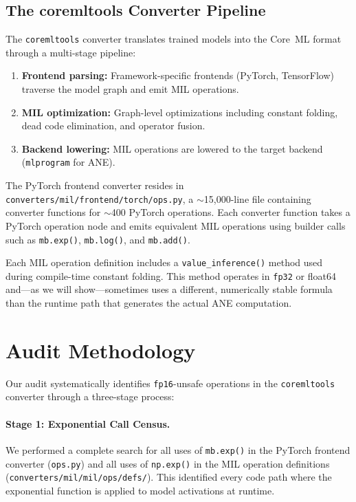 \documentclass[10pt,twocolumn]{article}
\newcommand{\fp}{\texttt{fp16}}
\newcommand{\fpt}{\texttt{fp32}}
\newcommand{\ane}{ANE}
\newcommand{\coreml}{Core~ML}
\newcommand{\coremltools}{\texttt{coremltools}}
\begin{document}
\subsection{The coremltools Converter Pipeline}
\label{sec:pipeline}

The \coremltools{} converter translates trained models into the
\coreml{} format through a multi-stage pipeline:

\begin{enumerate}[leftmargin=*,itemsep=1pt]
  \item \textbf{Frontend parsing:} Framework-specific frontends
    (PyTorch, TensorFlow) traverse the model graph and emit MIL
    operations.

  \item \textbf{MIL optimization:} Graph-level optimizations
    including constant folding, dead code elimination, and operator
    fusion.

  \item \textbf{Backend lowering:} MIL operations are lowered to
    the target backend (\texttt{mlprogram} for \ane{}).
\end{enumerate}

The PyTorch frontend converter resides in
\texttt{converters/mil/frontend/\allowbreak{}torch/ops.py}, a
$\sim$15{,}000-line file containing converter functions for $\sim$400 PyTorch
operations.  Each converter function takes a PyTorch operation node and emits
equivalent MIL operations using builder calls such as \texttt{mb.exp()},
\texttt{mb.log()}, and \texttt{mb.add()}.

Each MIL operation definition includes a \texttt{value\_inference()} method used
during compile-time constant folding.  This method operates in \fpt{} or float64
and---as we will show---sometimes uses a different, numerically stable formula
than the runtime path that generates the actual \ane{} computation.

\section{Audit Methodology}
\label{sec:methodology}

Our audit systematically identifies \fp{}-unsafe operations in the
\coremltools{} converter through a three-stage process:

\paragraph{Stage 1: Exponential Call Census.}
We performed a complete search for all uses of \texttt{mb.exp()} in the PyTorch
frontend converter (\texttt{ops.py}) and all uses of \texttt{np.exp()} in the
MIL operation definitions (\texttt{converters/mil/mil/ops/defs/}).  This
identified every code path where the exponential function is applied to model
activations at runtime.
\end{document}
